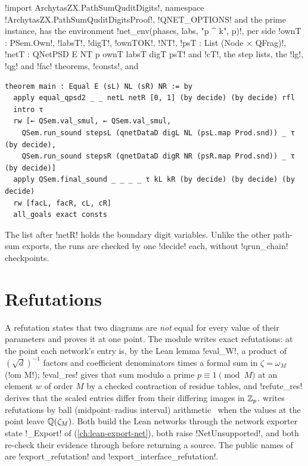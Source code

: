 {{{\lexlean!import ArchytasZX.PathSumQuditDigits!, namespace
\lexlean!ArchytasZX.PathSumQuditDigitsProof!, \lexpy!QNET_OPTIONS! and the prime instance, has the
environment \lexpy!net_env(phases, labs, "p ^ k", p)!, per side \lexlean!ownT : PSem.Own!,
\lexlean!labsT!, \lexlean!digT!, \lexlean!ownTOK!, \lexlean!NT!, \lexlean!psT : List (Node × QFrag)!,
\lexlean!netT : QNetPSD E NT p ownT labsT digT psT! and \lexlean!cT!, the step lists, the \lexlean!lg!,
\lexlean!qg! and \lexlean!fac! theorems, \lexlean!consts!, and
\begin{lstlisting}[style=lexlean]
theorem main : Equal E (sL) NL (sR) NR := by
  apply equal_qpsd2 _ _ netL netR [0, 1] (by decide) (by decide) rfl
  intro τ
  rw [← QSem.val_smul, ← QSem.val_smul,
    QSem.run_sound stepsL (qnetDataD digL NL (psL.map Prod.snd)) _ τ (by decide),
    QSem.run_sound stepsR (qnetDataD digR NR (psR.map Prod.snd)) _ τ (by decide)]
  apply QSem.final_sound _ _ _ _ τ kL kR (by decide) (by decide) (by decide)
  rw [facL, facR, cL, cR]
  all_goals exact consts
\end{lstlisting}
The list after \lexlean!netR! holds the boundary digit variables. Unlike the other path-sum
exports, the runs are checked by one \lexlean!decide! each, without \lexlean!qrun_chain! checkpoints.

\section{Refutations}\label{sec:lean-export-refute}

A refutation states that two diagrams are \emph{not} equal for every value of their
parameters and proves it at one point. The module
 writes exact refutations: at the point each network's
entry is, by the Lean lemma \lexlean!eval_W!, a product of $(\sqrt d)^{-1}$ factors and
coefficient denominators times a formal sum in $\zeta = \omega_M$ (\lexlean!om M!);
\lexlean!eval_res! gives that sum modulo a prime $p \equiv 1 \pmod M$ at an element $w$ of order
$M$ by a checked contraction of residue tables, and \lexlean!refute_res! derives that the scaled
entries differ from their differing images in $\mathbb{Z}_{p}$.
 writes refutations by ball (midpoint--radius
interval) arithmetic~\cite{vanderhoeven2009ball} when the values at the point leave
$\mathbb{Q}(\zeta_M)$. Both build the Lean networks through the network exporter state \lexpy!_Export! of
 (\cref{ch:lean-export-net}), both raise
\lexpy!NetUnsupported!, and both re-check their evidence through
 before returning a source. The public names of
 are \lexpy!export_refutation! and
\lexpy!export_interface_refutation!.

}}}

